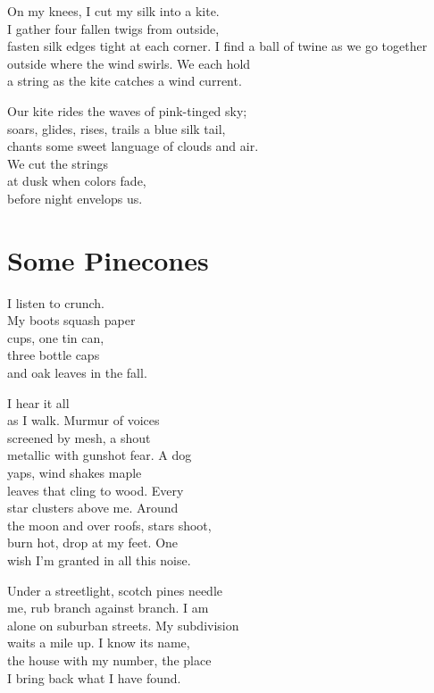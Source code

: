\documentclass[twoside,10pt]{book}
\begin{document}
On my knees, I cut my silk into a kite.\\
I gather four fallen twigs from outside,\\
fasten silk edges tight at each corner. I find a ball of twine as we go
together\\
outside where the wind swirls. We each hold\\
a string as the kite catches a wind current.

Our kite rides the waves of pink-tinged sky;\\
soars, glides, rises, trails a blue silk tail,\\
chants some sweet language of clouds and air.\\
\clearpage
We cut the strings\\
at dusk when colors fade,\\
before night envelops us.


\clearpage
\section{Some Pinecones}

I listen to crunch.\\
My boots squash paper\\
cups, one tin can,\\
three bottle caps\\
and oak leaves in the fall.

I hear it all\\
as I walk. Murmur of voices\\
screened by mesh, a shout\\
metallic with gunshot fear. A dog\\
yaps, wind shakes maple\\
leaves that cling to wood. Every\\
star clusters above me. Around\\
the moon and over roofs, stars shoot,\\
burn hot, drop at my feet. One\\
wish I'm granted in all this noise.

Under a streetlight, scotch pines needle\\
me, rub branch against branch. I am\\
alone on suburban streets. My subdivision\\
waits a mile up. I know its name,\\
the house with my number, the place\\
I bring back what I have found.
\end{document}
